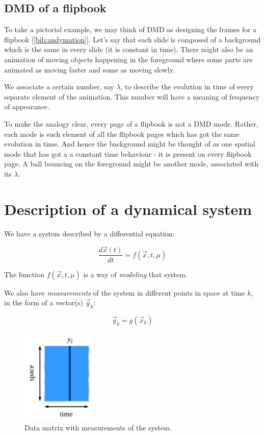 \documentclass[10pt,twocolumn]{article}
\begin{document}
\subsection{DMD of a flipbook}

To take a pictorial example, we may think of DMD as designing the frames for a flipbook [\ref{bib:andymation}]. Let's say that each slide is composed of a background which is the same in every slide (it is constant in time). There might also be an animation of moving objects happening in the foreground where some parts are animated as moving faster and some as moving slowly.

We associate a certain number, say $\lambda$, to describe the evolution in time of every separate element of the animation. This number will have a meaning of frequency of appearance.

To make the analogy clear, every page of a flipbook is not a DMD mode. Rather, each mode is such element of all the flipbook pages which has got the same evolution in time. And hence the background might be thought of as one spatial mode that has got a a constant time behaviour - it is present on every flipbook page. A ball bouncing on the foreground might be another mode, associated with its $\lambda$. 

\newpage

\section{Description of a dynamical system}

We have a system described by a differential equation:

\begin{equation} \label{eq:system_DE}
\frac{d \vec{x}(t)}{dt} = f(\vec{x}, t, \mu)
\end{equation}

The function $f(\vec{x}, t, \mu)$ is a way of \textit{modeling} that system.

We also have \textit{measurements} of the system in different points in space at time $k$, in the form of a vector(s) $\vec{y}_k$:

\begin{equation}
\vec{y}_k = g(\vec{x}_k)
\end{equation}

\begin{figure}
\centering\includegraphics[width=3.5cm]{data-matrix.png}
\caption{Data matrix with measurements of the system.}
\label{fig:data-matrix}
\end{figure}
\end{document}
